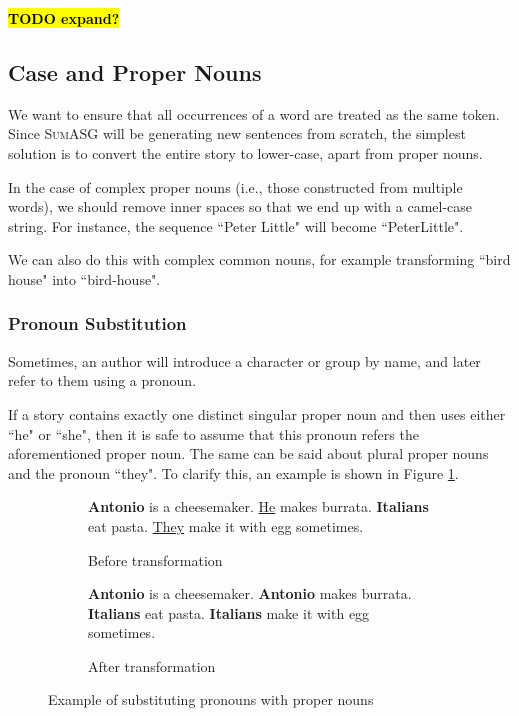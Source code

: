\textcolor{red}{\textbf{\hl{TODO expand?}}}

\subsection{Case and Proper Nouns}

We want to ensure that all occurrences of a word are treated as the same token. Since \textsc{SumASG} will be generating new sentences from scratch, the simplest solution is to convert the entire story to lower-case, apart from proper nouns.

In the case of complex proper nouns (i.e., those constructed from multiple words), we should remove inner spaces so that we end up with a camel-case string. For instance, the sequence ``Peter Little" will become ``PeterLittle".

We can also do this with complex common nouns, for example transforming ``bird house" into ``bird-house".

\subsubsection{Pronoun Substitution}

Sometimes, an author will introduce a character or group by name, and later refer to them using a pronoun.

If a story contains exactly one distinct singular proper noun and then uses either ``he" or ``she", then it is safe to assume that this pronoun refers the aforementioned proper noun. The same can be said about plural proper nouns and the pronoun ``they".
To clarify this, an example is shown in Figure \ref{fig:pronoun_substitution}.

\begin{figure}[H]
\begin{subfigure}{\textwidth}
\begin{displayquote}
\textbf{Antonio} is a cheesemaker. \underline{He} makes burrata.
\textbf{Italians} eat pasta. \underline{They} make it with egg sometimes.
\end{displayquote}
\caption{Before transformation}
\vspace{\baselineskip}
\end{subfigure}
\begin{subfigure}{\textwidth}
\begin{displayquote}
\textbf{Antonio} is a cheesemaker. \textbf{Antonio} makes burrata.
\textbf{Italians} eat pasta. \textbf{Italians} make it with egg sometimes.
\caption{After transformation}
\end{displayquote}
\end{subfigure}
\caption{Example of substituting pronouns with proper nouns}
\label{fig:pronoun_substitution}
\end{figure}

